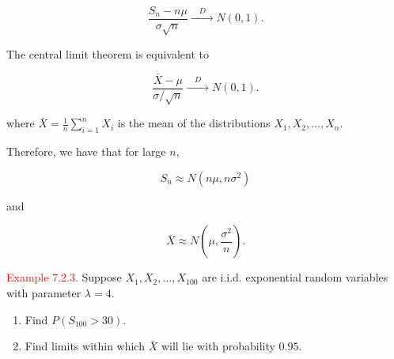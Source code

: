 \documentclass[
]{book}
\providecommand{\tightlist}{%
  \setlength{\itemsep}{0pt}\setlength{\parskip}{0pt}}
\begin{document}
\[ \frac{S_n - n\mu}{\sigma \sqrt{n}} \xrightarrow{\quad D \quad} N(0,1).\]

The central limit theorem is equivalent to

\[\frac{\bar{X} - \mu}{\sigma/\sqrt{n}} \xrightarrow{\quad D \quad} N(0,1).\]

where \(\bar{X} = \frac{1}{n} \sum_{i=1}^n X_i\) is the mean of the distributions \(X_1, X_2, \ldots , X_n\).

Therefore, we have that for large \(n\),

\[ S_n \approx N(n \mu, n \sigma^2) \]

and

\[ \bar{X} \approx N\left(\mu, \frac{\sigma^2}{n} \right). \]

\leavevmode{}%
\textcolor{red}{Example 7.2.3.}
Suppose \(X_1,X_2,\dots,X_{100}\) are i.i.d. exponential random variables with parameter \(\lambda=4\).

\begin{enumerate}
\def\labelenumi{(\alph{enumi})}
\tightlist
\item
  Find \(P(S_{100} > 30)\).\\
\item
  Find limits within which \(\bar{X}\) will lie with probability \(0.95\).\\
\end{enumerate}
\end{document}
